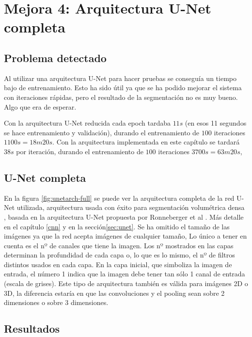 \chapter{Mejora 4: Arquitectura U-Net completa}\label{full_unet}

\section{Problema detectado}\label{sec:full_unet_problem}

Al utilizar una arquitectura U-Net para hacer pruebas se conseguía un tiempo bajo de entrenamiento. Esto ha sido útil ya que se ha podido mejorar el sistema con iteraciones rápidas, pero el resultado de la segmentación no es muy bueno. Algo que era de esperar.

Con la arquitectura U-Net reducida cada epoch tardaba $11s$ (en esos 11 segundos se hace entrenamiento y validación), durando el entrenamiento de $100$ iteraciones $1100s = 18m20s$. Con la arquitectura implementada en este capítulo se tardará $38s$ por iteración, durando el entrenamiento de $100$ iteraciones $3700s = 63m20s$, 

\section{U-Net completa}\label{sec:full_unet_change}

En la figura \ref{fig:unetarch-full} se puede ver la arquitectura completa de la red U-Net utilizada, arquitectura usada con éxito para segmentación volumétrica densa \cite{Cicek2016}, basada en la arquitectura U-Net propuesta por Ronneberger et al \cite{Ronneberger2015}. Más detalle en el capítulo \ref{cnn} y en la sección\ref{sec:unet}. Se ha omitido el tamaño de las imágenes ya que la red acepta imágenes de cualquier tamaño, Lo único a tener en cuenta es el nº de canales que tiene la imagen. Los nº mostrados en las capas determinan la profundidad de cada capa o, lo que es lo mismo, el nº de filtros distintos usados en cada capa. En la capa inicial, que simboliza la imagen de entrada, el número 1 indica que la imagen debe tener tan sólo 1 canal de entrada (escala de grises). Este tipo de arquitectura también es válida para imágenes 2D o 3D, la diferencia estaría en que las convoluciones y el pooling sean sobre 2 dimensiones o sobre 3 dimensiones.


\section{Resultados}\label{sec:full_unet_resultados}

